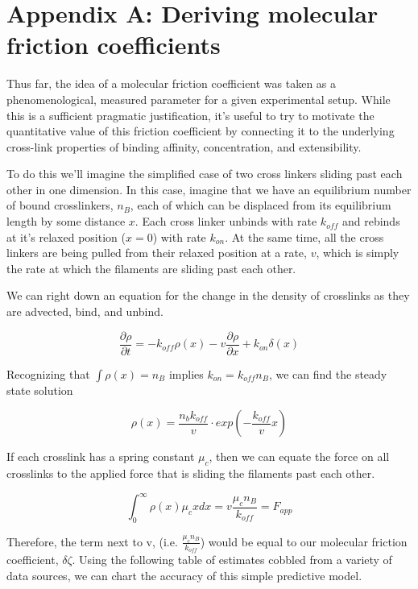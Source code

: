 \documentclass[prb,11pt]{revtex4-1}
\begin{document}
\section{Appendix A: Deriving molecular friction coefficients}
Thus far, the idea of a molecular friction coefficient was taken as a phenomenological, measured parameter for a given experimental setup.  While this is a sufficient pragmatic justification, it's useful to try to motivate the quantitative value of this friction coefficient by connecting it to the underlying cross-link properties of binding affinity, concentration, and extensibility.

To do this we'll imagine the simplified case of two cross linkers sliding past each other in one dimension.  In this case, imagine that we have an equilibrium number of bound crosslinkers, $n_B$, each of which can be displaced from its equilibrium length by some distance $x$.  Each cross linker unbinds with rate $k_{off}$ and rebinds at it's relaxed position ($x=0$) with rate $k_{on}$.  At the same time, all the cross linkers are being pulled from their relaxed position at a rate, $v$, which is simply the rate at which the filaments are sliding past each other.  

We can right down an equation for the change in the density of crosslinks as they are advected, bind, and unbind.

\begin{equation}
\frac{\partial \rho}{\partial t} = -k_{off}\rho(x) - v\frac{\partial \rho}{\partial x} + k_{on}\delta(x)
\end{equation}

Recognizing that $\int \rho(x)=n_B$ implies $k_{on}=k_{off}n_B$, we can find the steady state solution

\begin{equation}
\rho(x) = \frac{n_b k_{off}}{v}\cdot exp\left ( -\frac{k_{off}}{v}x \right )
\end{equation}

If each crosslink has a spring constant $\mu_c$, then we can equate the force on all crosslinks to the applied force that is sliding the filaments past each other.

\begin{equation}
\int_{0}^{\infty}\rho(x)\mu_cx dx = v \frac{\mu_c n_B}{k_{off}}= F_{app}
\end{equation}

Therefore, the term next to v, (i.e. $\tfrac{\mu_c n_B}{k_{off}}$) would be equal to our molecular friction coefficient, $\delta\zeta$.  Using the following table of estimates cobbled from a variety of data sources, we can chart the accuracy of this simple predictive model.
\end{document}
